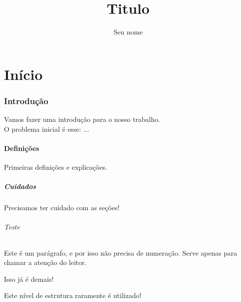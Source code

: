 \documentclass{article}
\begin{document}
\title{Titulo}
\author{Seu nome}
\maketitle
\part{Início}
\section{Introdução}
Vamos fazer uma introdução para o nosso trabalho.\\
O problema inicial é esse: ...
\subsection{Definições}
Primeiras definições e explicações.
\subsubsection{Cuidados}
Precisamos ter cuidado com as seções!
\paragraph{Teste}
Este é um parágrafo, e por isso não precisa de numeração. Serve apenas para chamar a atenção do leitor.
\subparagraph{Isso já é demais!}
Este nível de estrutura raramente é utilizado!
\end{document}
